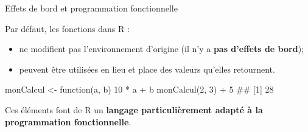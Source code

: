 \documentclass[12pt,ignorenonframetext,]{beamer}
\newenvironment{Shaded}{}{}
\newcommand{\ControlFlowTok}[1]{\textcolor[rgb]{0.00,0.00,1.00}{#1}}
\newcommand{\DecValTok}[1]{#1}
\newcommand{\KeywordTok}[1]{\textcolor[rgb]{0.00,0.00,1.00}{#1}}
\newcommand{\NormalTok}[1]{#1}
\newcommand{\OperatorTok}[1]{#1}
\newcommand{\StringTok}[1]{\textcolor[rgb]{0.00,0.50,0.50}{#1}}
\providecommand{\tightlist}{%
  \setlength{\itemsep}{0pt}\setlength{\parskip}{0pt}}
\renewenvironment{Shaded}{\begin{snugshade}}{\end{snugshade}}
\begin{document}
\begin{frame}[fragile]{\large Effets de bord et programmation
fonctionnelle}
\protect\hypertarget{effets-de-bord-et-programmation-fonctionnelle}{}

Par défaut, les fonctions dans R :

\begin{itemize}
\tightlist
\item
  ne modifient pas l’environnement d’origine (il n’y a \textbf{pas
  d’effets de bord});
\item
  peuvent être utilisées en lieu et place des valeurs qu’elles
  retournent.
\end{itemize}

\begin{Shaded}
\begin{Highlighting}[]
\NormalTok{monCalcul <-}\StringTok{  }\ControlFlowTok{function}\NormalTok{(a, b) }\DecValTok{10} \OperatorTok{*}\StringTok{ }\NormalTok{a }\OperatorTok{+}\StringTok{ }\NormalTok{b}
\KeywordTok{monCalcul}\NormalTok{(}\DecValTok{2}\NormalTok{, }\DecValTok{3}\NormalTok{) }\OperatorTok{+}\StringTok{ }\DecValTok{5}
\NormalTok{  ## [1] 28}
\end{Highlighting}
\end{Shaded}

\pause Ces éléments font de R un \textbf{langage particulièrement adapté
à la programmation fonctionnelle}.

\end{frame}
\end{document}
